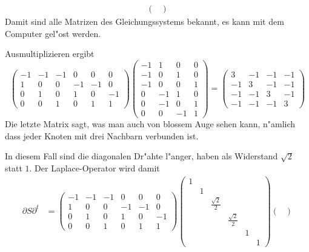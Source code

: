 {\begin{loesung}
\begin{teilaufgaben}
\begin{align*}
\begin{pmatrix}
\end{pmatrix}
\end{align*}
Damit sind alle Matrizen des Gleichungssystems bekannt, es kann mit
dem Computer gel"ost werden.
\item Ausmultiplizieren ergibt
\[
\begin{pmatrix}
-1&-1&-1& 0& 0& 0\\
 1& 0& 0&-1&-1& 0\\
 0& 1& 0& 1& 0&-1\\
 0& 0& 1& 0& 1& 1
\end{pmatrix}
\begin{pmatrix}
  -1&  1&  0&  0\\
  -1&  0&  1&  0\\
  -1&  0&  0&  1\\
   0& -1&  1&  0\\
   0& -1&  0&  1\\
   0&  0& -1&  1
\end{pmatrix}
=\begin{pmatrix}
   3& -1& -1& -1\\
  -1&  3& -1& -1\\
  -1& -1&  3& -1\\
  -1& -1& -1&  3
\end{pmatrix}
\]
Die letzte Matrix sagt, was man auch von blossem Auge sehen kann,
n"amlich dass jeder Knoten mit drei Nachbarn verbunden ist.
\item In diesem Fall sind die diagonalen Dr"ahte l"anger, haben
als Widerstand $\sqrt{2}$ statt $1$. Der Laplace-Operator wird 
damit
\begin{align*}
\partial S\partial^t
&=
\begin{pmatrix}
-1&-1&-1& 0& 0& 0\\
 1& 0& 0&-1&-1& 0\\
 0& 1& 0& 1& 0&-1\\
 0& 0& 1& 0& 1& 1
\end{pmatrix}
\begin{pmatrix}
1& &                &                & & \\
 &1&                &                & & \\
 & &\frac{\sqrt{2}}2&                & & \\
 & &                &\frac{\sqrt{2}}2& & \\
 & &                &                &1& \\
 & &                &                & &1
\end{pmatrix}
\begin{pmatrix}

\end{pmatrix}
\end{align*}
\end{teilaufgaben}
\end{loesung}}
